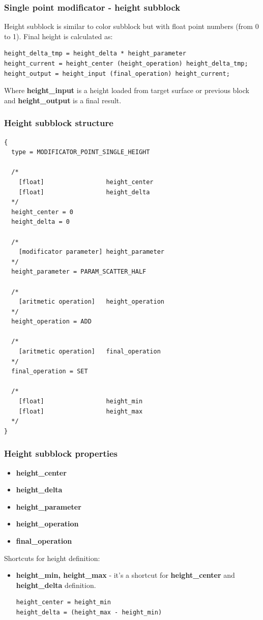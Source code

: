 \documentclass[9pt]{article}
\begin{document}
\subsubsection{Single point modificator - height subblock}

Height subblock is similar to color subblock but
with float point numbers (from 0 to 1). Final height
is calculated as:
\begin{verbatim}
height_delta_tmp = height_delta * height_parameter
height_current = height_center (height_operation) height_delta_tmp;
height_output = height_input (final_operation) height_current;
\end{verbatim}
Where {\bf height\_input} is a height loaded from target surface or previous
block and {\bf height\_output} is a final result.

\subsubsection*{Height subblock structure}
\begin{verbatim}
{
  type = MODIFICATOR_POINT_SINGLE_HEIGHT

  /*    
    [float]                 height_center
    [float]                 height_delta
  */
  height_center = 0
  height_delta = 0

  /*
    [modificator parameter] height_parameter
  */  
  height_parameter = PARAM_SCATTER_HALF
  
  /*  
    [aritmetic operation]   height_operation
  */
  height_operation = ADD
  
  /*  
    [aritmetic operation]   final_operation
  */
  final_operation = SET
  
  /*
    [float]                 height_min
    [float]                 height_max    
  */  
}
\end{verbatim}
\subsubsection*{Height subblock properties}
\begin{itemize}
\item{\bf height\_center}
\item{\bf height\_delta}
\item{\bf height\_parameter}
\item{\bf height\_operation}
\item{\bf final\_operation}
\end{itemize}
Shortcuts for height definition:
\begin{itemize}
\item{\bf height\_min, height\_max} - it's a shortcut for {\bf height\_center} and 
{\bf height\_delta} definition.
\begin{verbatim}
height_center = height_min
height_delta = (height_max - height_min)
\end{verbatim}
\end{itemize}
\end{document}
